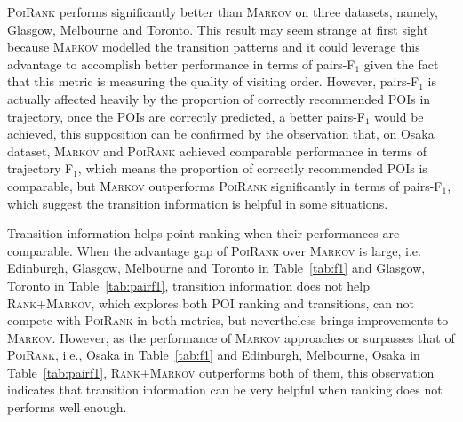 \textsc{PoiRank} performs significantly better than \textsc{Markov} on three datasets, namely,
Glasgow, Melbourne and Toronto.
%
This result may seem strange at first sight because \textsc{Markov} modelled the transition patterns and it could leverage
this advantage to accomplish better performance in terms of pairs-F$_1$ given the fact that this metric is measuring the quality
of visiting order.
However, pairs-F$_1$ is actually affected heavily by the proportion of correctly recommended POIs in trajectory,
once the POIs are correctly predicted, a better pairs-F$_1$ would be achieved,
this supposition can be confirmed by the observation that, on Osaka dataset, \textsc{Markov} and \textsc{PoiRank} achieved
comparable performance in terms of trajectory F$_1$, which means the proportion of correctly recommended POIs is comparable,
but \textsc{Markov} outperforms \textsc{PoiRank} significantly in terms of pairs-F$_1$,
which suggest the transition information is helpful in some situations.

Transition information helps point ranking when their performances are comparable.
When the advantage gap of \textsc{PoiRank} over \textsc{Markov} is large,
i.e. Edinburgh, Glasgow, Melbourne and Toronto in Table~\ref{tab:f1} and Glasgow, Toronto in Table~\ref{tab:pairf1},
transition information does not help \textsc{Rank+Markov}, which explores both POI ranking and transitions,
can not compete with \textsc{PoiRank} in both metrics, but nevertheless brings improvements to \textsc{Markov}.
However, as the performance of \textsc{Markov} approaches or surpasses that of \textsc{PoiRank},
i.e., Osaka in Table~\ref{tab:f1} and Edinburgh, Melbourne, Osaka in Table~\ref{tab:pairf1},
\textsc{Rank+Markov} outperforms both of them, this observation indicates that transition information can be very helpful when
ranking does not performs well enough.


